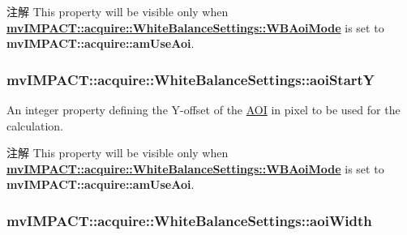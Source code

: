 \begin{DoxyNote}{注解}
This property will be visible only when {\bfseries \hyperlink{classmv_i_m_p_a_c_t_1_1acquire_1_1_white_balance_settings_a60af41e60e38c698d39b36ee745b2648}{mv\+I\+M\+P\+A\+C\+T\+::acquire\+::\+White\+Balance\+Settings\+::\+W\+B\+Aoi\+Mode}} is set to {\bfseries mv\+I\+M\+P\+A\+C\+T\+::acquire\+::am\+Use\+Aoi}. 
\end{DoxyNote}
\hypertarget{classmv_i_m_p_a_c_t_1_1acquire_1_1_white_balance_settings_a04c25fbcb772dcca1335d4a2b793dd02}{
\subsubsection[{aoi\+Start\+Y}]{ mv\+I\+M\+P\+A\+C\+T\+::acquire\+::\+White\+Balance\+Settings\+::aoi\+Start\+Y}}\label{classmv_i_m_p_a_c_t_1_1acquire_1_1_white_balance_settings_a04c25fbcb772dcca1335d4a2b793dd02}


An integer property defining the Y-\/offset of the \hyperlink{struct_a_o_i}{A\+O\+I} in pixel to be used for the calculation. 

\begin{DoxyNote}{注解}
This property will be visible only when {\bfseries \hyperlink{classmv_i_m_p_a_c_t_1_1acquire_1_1_white_balance_settings_a60af41e60e38c698d39b36ee745b2648}{mv\+I\+M\+P\+A\+C\+T\+::acquire\+::\+White\+Balance\+Settings\+::\+W\+B\+Aoi\+Mode}} is set to {\bfseries mv\+I\+M\+P\+A\+C\+T\+::acquire\+::am\+Use\+Aoi}. 
\end{DoxyNote}
\hypertarget{classmv_i_m_p_a_c_t_1_1acquire_1_1_white_balance_settings_a32307a598d3cadc6d07a829af463834b}{
\subsubsection[{aoi\+Width}]{ mv\+I\+M\+P\+A\+C\+T\+::acquire\+::\+White\+Balance\+Settings\+::aoi\+Width}}\label{classmv_i_m_p_a_c_t_1_1acquire_1_1_white_balance_settings_a32307a598d3cadc6d07a829af463834b}


